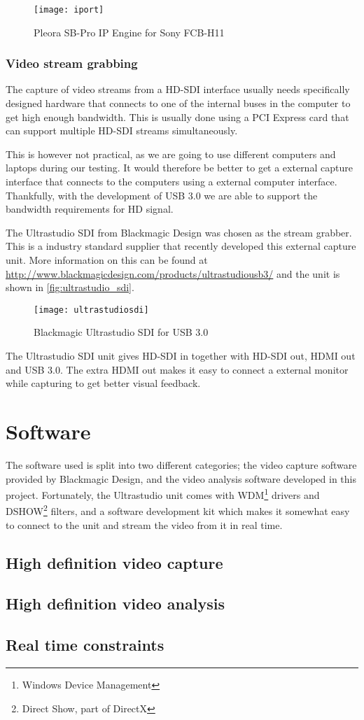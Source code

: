 \begin{figure}[htbp]
	\centering
	\texttt{[image: iport]}
	\caption{Pleora SB-Pro IP Engine for Sony FCB-H11}
	\label{fig:iport}
\end{figure}

\subsubsection{Video stream grabbing}
The capture of video streams from a HD-SDI interface usually needs specifically designed hardware that 
connects to one of the internal buses in the computer to get high enough bandwidth. This is usually 
done using a PCI Express card that can support multiple HD-SDI streams simultaneously. 

This is 
however not practical, as we are going to use different computers and laptops during our testing. 
It would therefore be better to get a external capture interface that connects to the computers using a 
external computer interface. Thankfully, with the development of USB 3.0 we are able 
to support the bandwidth requirements for HD signal.

The Ultrastudio SDI from Blackmagic Design was chosen as the stream grabber. This is a industry standard 
supplier that recently developed this external capture unit. More information on this can be found at 
\url{http://www.blackmagicdesign.com/products/ultrastudiousb3/} and the unit is shown in \vref{fig:ultrastudio_sdi}.

\begin{figure}[htbp]
	\centering
	\texttt{[image: ultrastudiosdi]}
	\caption{Blackmagic Ultrastudio SDI for USB 3.0}
	\label{fig:ultrastudio_sdi}
\end{figure}

The Ultrastudio SDI unit gives HD-SDI in together with HD-SDI out, HDMI out and USB 3.0. The 
extra HDMI out makes it easy to connect a external monitor while capturing to get better visual feedback.



\section{Software}
The software used is split into two different categories; the video capture software provided by Blackmagic 
Design, and the video analysis software developed in this project. Fortunately, the Ultrastudio 
unit comes with WDM\footnote{Windows Device Management} drivers and DSHOW\footnote{Direct Show, part of DirectX} 
filters, and a software development kit which makes it somewhat easy to connect to the unit and stream 
the video from it in real time. 


\subsection{High definition video capture}

\subsection{High definition video analysis}

\subsection{Real time constraints}

